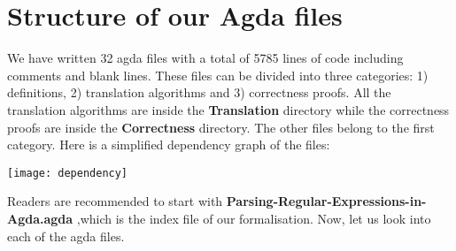 \chapter{Structure of our Agda files}
\par We have written 32 agda files with a total of 5785 lines of
code including comments and blank lines. These files can be divided into three categories:
1) definitions, 2) translation algorithms and 3) correctness
proofs. All the translation algorithms are inside the
\textbf{Translation} directory while the correctness proofs are inside
the \textbf{Correctness} directory. The other files belong to the
first category. Here is a simplified dependency graph of the files:

\begin{center} \texttt{[image: dependency]} \end{center}

\par Readers are recommended to start with \textbf{Parsing-Regular-Expressions-in-Agda.agda}
,which is the index file of our formalisation. Now, let us look into each of the agda files. 


